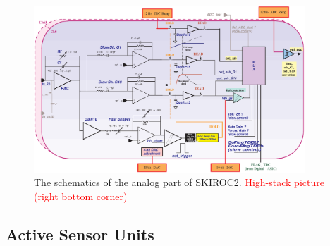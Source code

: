 \documentclass[a4paper,11pt]{article}
\newcommand{\todo}[1]{\textcolor{red}{{#1}}}
\begin{document}
\begin{figure}[!t]
  \centering
    \includegraphics[width=4in]{figs/skiroc2_block.eps}
\caption{The schematics of the analog part of SKIROC2. \todo{High-stack picture (right bottom corner)}}
\label{SKIROC2}
\end{figure}

\subsection{Active Sensor Units}
\label{sec:ASU}
\end{document}
